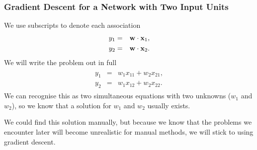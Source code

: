 \documentclass{beamer}
\newcommand{\bw}{       {\bf w      } }
\newcommand{\bx}{       {\bf x      } }
\newcommand{\bea}       { \begin{eqnarray}  }
\newcommand{\eea}       { \end{eqnarray}    }
\newcommand{\eg}{{e.g.\:}}
\begin{document}
\begin{frame}
  \frametitle{Gradient Descent for a Network with Two Input Units}
We use subscripts  
 to denote each association 
\bea
\begin{split}\label{eq2assoc}
	y_{1} & = & \bw \cdot  \bx_{1}, \\
	y_{2} & = & \bw  \cdot \bx_{2}. 
\end{split}
\eea
We will write the problem out in full
\bea
\begin{split}\label{eq2assocfull}
    y_{1} & = & w_{1} x_{11} + w_{2} x_{21}, \\
	y_{2} & = &  w_{1} x_{12} + w_{2} x_{22}. 
\end{split}
\eea
We can recognise this as two simultaneous equations with two unknowns ($w_{1}$ and $w_{2}$), so we know that a solution for $w_{1}$ and $w_{2}$ usually exists. 

We could find this solution manually, but because we know that the problems we encounter later will become unrealistic for manual methods, we will stick to using gradient descent. 
\end{frame}

\end{document}
